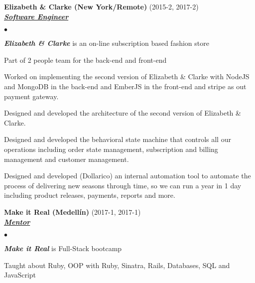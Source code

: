 \documentclass[a4paper]{article}
\newcommand{\employer}[3]{{
\textbf{#1} (#2)\\ \underline{\textbf{\emph{#3}}}\\ }}
\newenvironment{achievements}{\begin{list}{$\bullet$}{\topsep 0pt \itemsep
-2pt}}{\vspace*{4pt}\end{list}}
\newcommand{\emphasys}[1]{\textbf{\emph{#1}}}
\begin{document}
\newpage

\employer{ Elizabeth \& Clarke (New York/Remote)}{2015-2, 2017-2}{Software Engineer}
\begin{achievements}
\item \emphasys{Elizabeth \& Clarke} is an on-line subscription based fashion store
\item Part of 2 people team for the back-end and front-end
\item Worked on implementing the second version of Elizabeth \& Clarke with NodeJS and MongoDB in the back-end and EmberJS in the front-end and stripe as out payment gateway.
\item Designed and developed the architecture of the second version of Elizabeth \& Clarke.
\item Designed and developed the behavioral state machine that controls all our operations including order state management, subscription and billing management and customer management.
\item Designed and developed (Dollarico) an internal automation tool to automate the process of delivering new seasons through time, so we can run a year in 1 day including product releases, payments, reports and more.
\end{achievements}

\employer{Make it Real (Medell\'in)}{2017-1, 2017-1}{Mentor}
\begin{achievements}
\item \emphasys{Make it Real} is Full-Stack bootcamp
\item Taught about Ruby, OOP with Ruby, Sinatra, Rails, Databases, SQL and JavaScript
\end{achievements}

\end{document}

